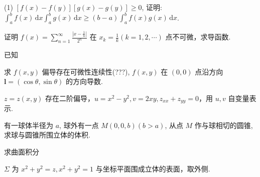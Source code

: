 (1) $[f(x) - f(y)][g(x) - g(y)] \geq 0$, 证明: $\int_{a}^{b} f(x) \, \mathrm{d}x \int_{a}^{b} g(x) \, \mathrm{d}x \geq (b - a) \int_{a}^{b} f(x) g(x) \, \mathrm{d}x$.\par
\nopagebreak[4]
证明 $f(x) = \sum_{n=1}^{\infty} \frac{|x - \frac{1}{n}|}{2^n}$ 在 $x_k = \frac{1}{k} (k = 1, 2, \cdots)$ 点不可微，求导函数.\par
\par{}
已知\par
\nopagebreak[4]
求 $f(x,y)$ 偏导存在可微性连续性(???), $f(x,y)$ 在 $(0,0)$ 点沿方向 $\pmb{l} = (\cos \theta, \sin \theta)$ 的方向导数.\par
$z = z(x,y)$ 存在二阶偏导，$u = x^2 - y^2, v = 2xy, z_{xx} + z_{yy} = 0$，用 $u, v$ 自变量表示.\par
有一球体半径为 $a$, 球外有一点 $M(0,0,b) (b > a)$, 从点 $M$ 作与球相切的圆锥, 求球与圆锥所围立体的体积.\par
\par{}
求曲面积分\par
\nopagebreak[4]
$\Sigma$ 为 $x^{2} + y^{2} = z, x^{2} + y^{2} = 1$ 与坐标平面围成立体的表面，取外侧.\par
